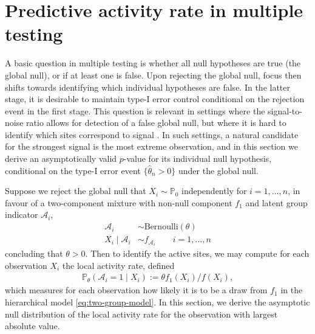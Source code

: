 \documentclass[11pt]{article}
\theoremstyle{definition}
\begin{document}
\section{Predictive activity rate in multiple testing}



A basic question in multiple testing is whether all null hypotheses are true (the global null), or if at least one is false. 
Upon rejecting the global null, focus then shifts towards identifying which individual hypotheses are false. In the latter stage, it is desirable to maintain type-I error control conditional on the rejection event in the first stage. This question is relevant in settings where the signal-to-noise ratio allows for detection of a false global null, but where it is hard to identify which sites correspond to signal \citep{donoho2004higher,donoho2015special}. 
In such settings, a natural candidate for the strongest signal is the most extreme observation, and in this section we derive an asymptotically valid $p$-value for its individual null hypothesis, 
conditional on the type-I error event $\{\hat{\theta}_n>0\}$ under the global null. 

Suppose we reject the global null that $X_i \sim \mathbb{P}_0$ independently for $i=1,\dots,n$, in favour of a two-component mixture with non-null component $f_1$ and latent group indicator $\mathcal{A}_i$, %
\begin{equation}
\label{eq:two-group-model}
\begin{aligned}
\mathcal{A}_i &\sim \text{Bernoulli}(\theta) \\
X_i \mid \mathcal{A}_i &\sim f_{\mathcal{A}_i} \hspace{2em} \text{$i=1,\dots,n$}
\end{aligned}
\end{equation}
concluding that $\theta>0$. Then to identify the active sites, we may compute for each observation $X_i$ the local activity rate, defined 
\begin{align*}
\mathbb{P}_\theta(\mathcal{A}_i=1 \mid X_i) := \theta f_1(X_i)/f(X_i),
\end{align*}
which measures for each observation how likely it is to be a draw from $f_1$ in the hierarchical model \eqref{eq:two-group-model}. In this section, we derive the asymptotic null distribution of the local activity rate for the observation with largest absolute value.
\end{document}
